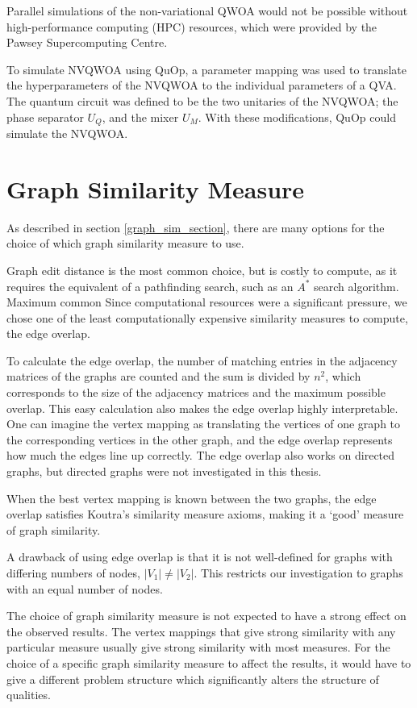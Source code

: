 Parallel simulations of the non-variational QWOA would not be possible without high-performance computing (HPC) resources, which were provided by the Pawsey Supercomputing Centre.

To simulate NVQWOA using QuOp, a parameter mapping was used to translate the hyperparameters of the NVQWOA to the individual parameters of a QVA. The quantum circuit was defined to be the two unitaries of the NVQWOA; the phase separator $U_Q$, and the mixer $U_M$. With these modifications, QuOp could simulate the NVQWOA.

\section{Graph Similarity Measure}
As described in section \ref{graph_sim_section}, there are many options for the choice of which graph similarity measure to use.

Graph edit distance is the most common choice, but is costly to compute, as it requires the equivalent of a pathfinding search, such as an $A^*$ search algorithm. Maximum common
Since computational resources were a significant pressure, we chose one of the least computationally expensive similarity measures to compute, the edge overlap.

To calculate the edge overlap, the number of matching entries in the adjacency matrices of the graphs are counted and the sum is divided by $n^2$, which corresponds to the size of the adjacency matrices and the maximum possible overlap. This easy calculation also makes the edge overlap highly interpretable. One can imagine the vertex mapping as translating the vertices of one graph to the corresponding vertices in the other graph, and the edge overlap represents how much the edges line up correctly. The edge overlap also works on directed graphs, but directed graphs were not investigated in this thesis.

When the best vertex mapping is known between the two graphs, the edge overlap satisfies Koutra's similarity measure axioms, making it a `good' measure of graph similarity.

A drawback of using edge overlap is that it is not well-defined for graphs with differing numbers of nodes, $|V_1|\neq|V_2|$. This restricts our investigation to graphs with an equal number of nodes.

The choice of graph similarity measure is not expected to have a strong effect on the observed results. The vertex mappings that give strong similarity with any particular measure usually give strong similarity with most measures. For the choice of a specific graph similarity measure to affect the results, it would have to give a different problem structure which significantly alters the structure of qualities.

